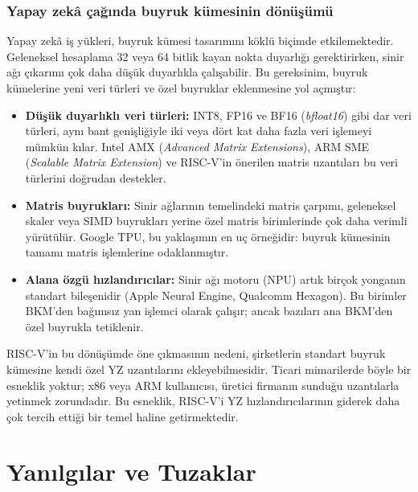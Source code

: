 \subsubsection*{Yapay zekâ çağında buyruk kümesinin dönüşümü}
Yapay zekâ iş yükleri, buyruk kümesi tasarımını köklü biçimde etkilemektedir. Geleneksel hesaplama 32 veya 64 bitlik kayan nokta duyarlığı gerektirirken, sinir ağı çıkarımı çok daha düşük duyarlıkla çalışabilir. Bu gereksinim, buyruk kümelerine yeni veri türleri ve özel buyruklar eklenmesine yol açmıştır:

\begin{itemize}[nosep]
\item \textbf{Düşük duyarlıklı veri türleri:} INT8, FP16 ve BF16 (\emph{bfloat16}) gibi dar veri türleri, aynı bant genişliğiyle iki veya dört kat daha fazla veri işlemeyi mümkün kılar. Intel AMX (\emph{Advanced Matrix Extensions}), ARM SME (\emph{Scalable Matrix Extension}) ve RISC-V'in önerilen matris uzantıları bu veri türlerini doğrudan destekler.
\item \textbf{Matris buyrukları:} Sinir ağlarının temelindeki matris çarpımı, geleneksel skaler veya SIMD buyrukları yerine özel matris birimlerinde çok daha verimli yürütülür. Google TPU, bu yaklaşımın en uç örneğidir: buyruk kümesinin tamamı matris işlemlerine odaklanmıştır.
\item \textbf{Alana özgü hızlandırıcılar:} Sinir ağı motoru (NPU) artık birçok yonganın standart bileşenidir (Apple Neural Engine, Qualcomm Hexagon). Bu birimler BKM'den bağımsız yan işlemci olarak çalışır; ancak bazıları ana BKM'den özel buyrukla tetiklenir.
\end{itemize}

RISC-V'in bu dönüşümde öne çıkmasının nedeni, şirketlerin standart buyruk kümesine kendi özel YZ uzantılarını ekleyebilmesidir. Ticari mimarilerde böyle bir esneklik yoktur; x86 veya ARM kullanıcısı, üretici firmanın sunduğu uzantılarla yetinmek zorundadır. Bu esneklik, RISC-V'i YZ hızlandırıcılarının giderek daha çok tercih ettiği bir temel haline getirmektedir.


\section{Yanılgılar ve Tuzaklar}
\label{sec:buyruk-yanilgilar}

